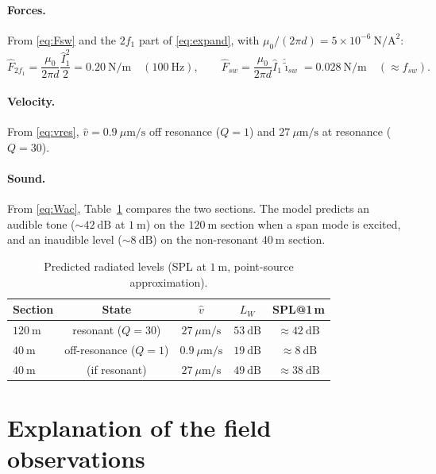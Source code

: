 \documentclass[11pt,a4paper,oneside]{book}
\begin{document}
\begin{onehalfspace}
\begin{appendices}
\paragraph{Forces.}
From \eqref{eq:Fsw} and the $2f_1$ part of \eqref{eq:expand}, with
$\mu_0/(2\pi d)=5\times10^{-6}\ \mathrm{N/A^2}$:
\[
\hat F_{2f_1}=\frac{\mu_0}{2\pi d}\frac{\hat I_1^2}{2}=0.20\ \mathrm{N/m}
\quad(100\ \mathrm{Hz}),
\qquad
\hat F_{sw}=\frac{\mu_0}{2\pi d}\hat I_1\hat{\tilde\imath}_{sw}=0.028\ \mathrm{N/m}
\quad(\approx f_{sw}).
\]

\paragraph{Velocity.}
From \eqref{eq:vres}, $\hat v=0.9\ \mu\mathrm{m/s}$ off resonance ($Q=1$) and
$27\ \mu\mathrm{m/s}$ at resonance ($Q=30$).

\paragraph{Sound.}
From \eqref{eq:Wac}, Table~\ref{tab:spl} compares the two sections. The model
predicts an audible tone ($\sim 42\ \mathrm{dB}$ at $1\ \mathrm{m}$) on the
$120\ \mathrm{m}$ section when a span mode is excited, and an inaudible level
($\sim 8\ \mathrm{dB}$) on the non-resonant $40\ \mathrm{m}$ section.

\begin{table}[h]
	\centering
	\caption{Predicted radiated levels (SPL at $1\ \mathrm{m}$, point-source
		approximation).}
	\label{tab:spl}
	\begin{tabular}{@{}lcccc@{}}
		\toprule
		Section & State & $\hat v$ & $L_W$ & SPL@1\,m \\
		\midrule
		$120\ \mathrm{m}$ & resonant ($Q{=}30$)    & $27\ \mu\mathrm{m/s}$  & $53\ \mathrm{dB}$ & $\approx 42\ \mathrm{dB}$ \\
		$40\ \mathrm{m}$  & off-resonance ($Q{=}1$)& $0.9\ \mu\mathrm{m/s}$ & $19\ \mathrm{dB}$ & $\approx 8\ \mathrm{dB}$ \\
		$40\ \mathrm{m}$  & (if resonant)          & $27\ \mu\mathrm{m/s}$  & $49\ \mathrm{dB}$ & $\approx 38\ \mathrm{dB}$ \\
		\bottomrule
	\end{tabular}
\end{table}

\section{Explanation of the field observations}\label{sec:length}

\end{appendices}
\end{onehalfspace}
\end{document}
